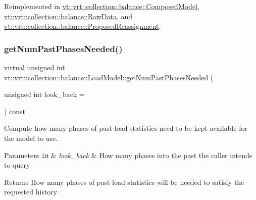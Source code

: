 Reimplemented in \hyperlink{classvt_1_1vrt_1_1collection_1_1balance_1_1_composed_model_abd58ffd308443021356aff2595c6980f}{vt\+::vrt\+::collection\+::balance\+::\+Composed\+Model}, \hyperlink{structvt_1_1vrt_1_1collection_1_1balance_1_1_raw_data_af52829981fa8aec26ac5cfc0a2d29cce}{vt\+::vrt\+::collection\+::balance\+::\+Raw\+Data}, and \hyperlink{structvt_1_1vrt_1_1collection_1_1balance_1_1_proposed_reassignment_a7134943ece9dc9a0d4539536f60eed6e}{vt\+::vrt\+::collection\+::balance\+::\+Proposed\+Reassignment}.

\mbox{\label{structvt_1_1vrt_1_1collection_1_1balance_1_1_load_model_a44905eb3e15e7f22b2f8d1fe7297cea0}} 
\subsubsection{\texorpdfstring{get\+Num\+Past\+Phases\+Needed()}{getNumPastPhasesNeeded()}}
{\footnotesize\ttfamily virtual unsigned int vt\+::vrt\+::collection\+::balance\+::\+Load\+Model\+::get\+Num\+Past\+Phases\+Needed (\begin{DoxyParamCaption}\item[{unsigned int}]{look\+\_\+back = {} }\end{DoxyParamCaption}) const\hspace{0.3cm}{\ttfamily [pure virtual]}}



Compute how many phases of past load statistics need to be kept available for the model to use. 


\begin{DoxyParams}[1]{Parameters}
\mbox{\tt in}  & {\em look\+\_\+back} & How many phases into the past the caller intends to query\\
\hline
\end{DoxyParams}
\begin{DoxyReturn}{Returns}
How many phases of past load statistics will be needed to satisfy the requested history 
\end{DoxyReturn}


